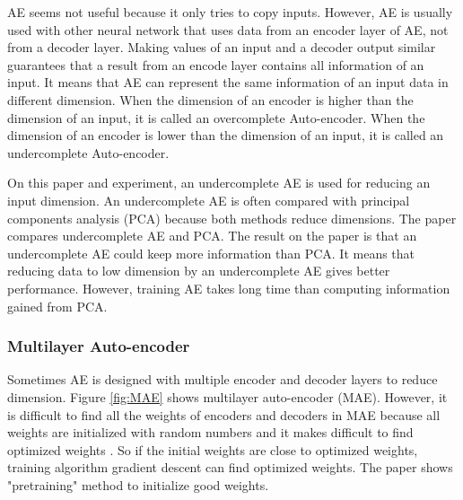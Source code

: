 \documentclass[draft,dvipsnames]{drexel-thesis}
\begin{document}
\begin{thesis}
AE seems not useful because it only tries to copy inputs. However, AE is usually used with other neural network that uses data from an encoder layer of AE, not from a decoder layer. Making values of an input and a decoder output similar guarantees that a result from an encode layer contains all information of an input. It means that AE can represent the same information of an input data in different dimension. When the dimension of an encoder is higher than the dimension of an input, it is called an overcomplete Auto-encoder. When the dimension of an encoder is lower than the dimension of an input, it is called an undercomplete Auto-encoder.

On this paper and experiment, an undercomplete AE is used for reducing an input dimension. An undercomplete AE is often compared with principal components analysis (PCA) because both methods reduce dimensions. The paper \cite{hinton2006reducing} compares undercomplete AE and PCA. The result on the paper is that an undercomplete AE could keep more information than PCA. It means that reducing data to low dimension by an undercomplete AE gives better performance. However, training AE takes long time than computing information gained from PCA.



\subsubsection{Multilayer Auto-encoder}\label{subsubsec:MAE}
	Sometimes AE is designed with multiple encoder and decoder layers to reduce dimension. Figure \ref{fig:MAE} shows multilayer auto-encoder (MAE). However, it is difficult to find all the weights of encoders and decoders in MAE because all weights are initialized with random numbers and it makes difficult to find optimized weights \cite{zaremba2014recurrent}. So if the initial weights are close to optimized weights, training algorithm gradient descent can find optimized weights. The paper \cite{zaremba2014recurrent} shows "pretraining" method to initialize good weights.


\end{thesis}
\end{document}
